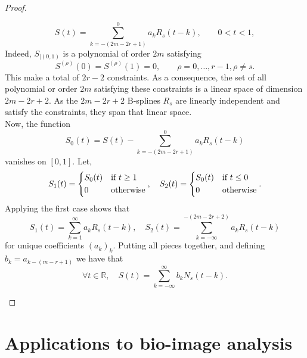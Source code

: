 \begin{proof}
\begin{enumerate}
\begin{equation*}
	S(t) = \sum_{k=-(2m-2r+1)}^{0} a_k R_s(t-k), \qquad 0 < t < 1,
      \end{equation*}
      Indeed, $S_{|(0,1)}$ is a polynomial of order $2m$ satisfying 
      \begin{equation*}
	S^{(\rho)}(0) = S^{(\rho)}(1) = 0, \qquad \rho=0, \ldots, r-1, \rho \neq s.
      \end{equation*}
      This make a total of $2r-2$ constraints. As a consequence, the set of all polynomial or order $2m$ satisfying 
      these constraints is a linear space of dimension $2m-2r+2$. As the $2m-2r+2$ B-splines $R_s$ are linearly 
      independent and satisfy the constraints, they span that linear space. \\ 

      Now, the function
      \begin{equation*}
	S_0(t) = S(t) - \sum_{k=-(2m-2r+1)}^{0} a_k R_s(t-k)
      \end{equation*}
      vanishes on $[0,1]$. Let,
      \begin{equation*}
	S_1(t) = \begin{dcases} S_0(t) &  \text{if} \ t \geq 1 \\
	  0 & \text{otherwise}
	\end{dcases},
	\quad
	S_2(t) = \begin{dcases} S_0(t) &  \text{if} \ t \leq 0 \\
	  0 & \text{otherwise}
	\end{dcases}.
      \end{equation*}
      Applying the first case shows that 
      \begin{equation*}
	S_1(t) = \sum_{k=1}^{\infty} a_k R_s(t-k), \quad S_2(t) = \sum_{k=-\infty}^{-(2m-2r+2)} a_k R_s(t-k)
      \end{equation*}
      for unique coefficients ${(a_k)}_k$. Putting all pieces together, and defining $b_k = a_{k-(m-r+1)}$ we have that
      \begin{equation*}
	\forall t \in \mathbb{R}, \quad S(t) = \sum_{k=-\infty}^{\infty} b_k N_s(t-k).
      \end{equation*}
  \end{enumerate}
\end{proof}

\section{Applications to bio-image analysis}

